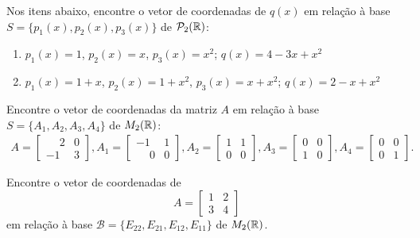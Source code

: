 \documentclass[12pt]{exam}
\begin{document}
    \begin{exercicio}
        Nos itens abaixo, encontre o vetor de coordenadas de $q(x)$ em relação à base $S = \{p_1(x), p_2(x), p_3(x)\}$ de $\mathcal{P}_2(\mathbb{R})$:
        \begin{enumerate}[label={\alph*})]
            \item $p_1(x) = 1$, $p_2(x) = x$, $p_3(x) = x^2$; $q(x) = 4 - 3x + x^2$
            \item $p_1(x) = 1 + x$, $p_2(x) = 1 + x^2$, $p_3(x) = x + x^2$; $q(x) = 2 - x + x^2$
        \end{enumerate}
    \end{exercicio}

    \begin{exercicio}
        Encontre o vetor de coordenadas da matriz $A$ em relação à base $S = \{A_1, A_2, A_3, A_4\}$ de $M_2(\mathbb{R})$:
        \begin{align*}
            A = \begin{bmatrix}
                \phantom{-} 2 & 0\\
                -1 & 3
            \end{bmatrix},
            A_1 = \begin{bmatrix}
                -1 & 1\\
                \phantom{-} 0 & 0
            \end{bmatrix},
            A_2 = \begin{bmatrix}
                1 & 1\\
                0 & 0
            \end{bmatrix},
            A_3 = \begin{bmatrix}
                0 & 0\\
                1 & 0
            \end{bmatrix},
            A_4 = \begin{bmatrix}
                0 & 0\\
                0 & 1
            \end{bmatrix}.
        \end{align*}
    \end{exercicio}


    \begin{exercicio}
        Encontre o vetor de coordenadas de
        \[
            A = \begin{bmatrix}
                1 & 2\\
                3 & 4
            \end{bmatrix}
        \]
        em relação à base $\mathcal{B} = \{E_{22}, E_{21}, E_{12}, E_{11}\}$ de $M_2(\mathbb{R})$.
    \end{exercicio}
\end{document}

